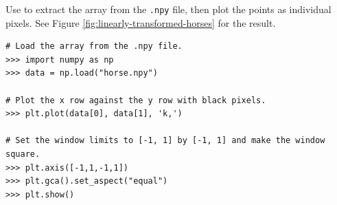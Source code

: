 Use 
to extract the array from the \texttt{.npy} file, then plot the points as individual pixels.
See Figure \ref{fig:linearly-transformed-horses} for the result.

\begin{lstlisting}
# Load the array from the .npy file.
>>> import numpy as np
>>> data = np.load("horse.npy")

# Plot the x row against the y row with black pixels.
>>> plt.plot(data[0], data[1], 'k,')

# Set the window limits to [-1, 1] by [-1, 1] and make the window square.
>>> plt.axis([-1,1,-1,1])
>>> plt.gca().set_aspect("equal")
>>> plt.show()
\end{lstlisting}

